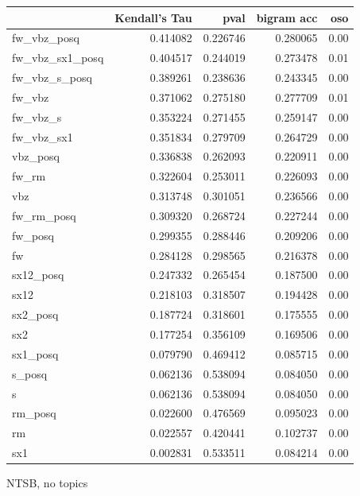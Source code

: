 \documentclass[11pt]{article}
\begin{document}
\begin{figure*}[h]
\begin{tabular}{lrrrr}
\toprule
{} &  Kendall's Tau &      pval &  bigram acc &   oso \\
\midrule
fw\_vbz\_posq     &       0.414082 &  0.226746 &    0.280065 &  0.00 \\
fw\_vbz\_sx1\_posq &       0.404517 &  0.244019 &    0.273478 &  0.01 \\
fw\_vbz\_s\_posq   &       0.389261 &  0.238636 &    0.243345 &  0.00 \\
fw\_vbz          &       0.371062 &  0.275180 &    0.277709 &  0.01 \\
fw\_vbz\_s        &       0.353224 &  0.271455 &    0.259147 &  0.00 \\
fw\_vbz\_sx1      &       0.351834 &  0.279709 &    0.264729 &  0.00 \\
vbz\_posq        &       0.336838 &  0.262093 &    0.220911 &  0.00 \\
fw\_rm           &       0.322604 &  0.253011 &    0.226093 &  0.00 \\
vbz             &       0.313748 &  0.301051 &    0.236566 &  0.00 \\
fw\_rm\_posq      &       0.309320 &  0.268724 &    0.227244 &  0.00 \\
fw\_posq         &       0.299355 &  0.288446 &    0.209206 &  0.00 \\
fw              &       0.284128 &  0.298565 &    0.216378 &  0.00 \\
sx12\_posq       &       0.247332 &  0.265454 &    0.187500 &  0.00 \\
sx12            &       0.218103 &  0.318507 &    0.194428 &  0.00 \\
sx2\_posq        &       0.187724 &  0.318601 &    0.175555 &  0.00 \\
sx2             &       0.177254 &  0.356109 &    0.169506 &  0.00 \\
sx1\_posq        &       0.079790 &  0.469412 &    0.085715 &  0.00 \\
s\_posq          &       0.062136 &  0.538094 &    0.084050 &  0.00 \\
s               &       0.062136 &  0.538094 &    0.084050 &  0.00 \\
rm\_posq         &       0.022600 &  0.476569 &    0.095023 &  0.00 \\
rm              &       0.022557 &  0.420441 &    0.102737 &  0.00 \\
sx1             &       0.002831 &  0.533511 &    0.084214 &  0.00 \\
\bottomrule
\end{tabular}
\caption{NTSB, no topics}
\end{figure*}
\end{document}

